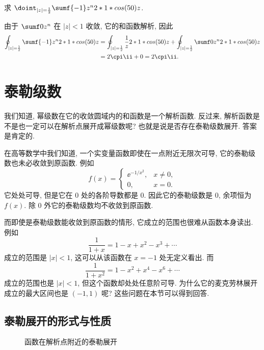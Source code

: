 \begin{example}
  求 $\doint_{|z|=\half} \sumf{-1} z^n\d z$.
\end{example}

\begin{solution}
  由于 $\sumf0 z^n$ 在 $|z|<1$ 收敛, 它的和函数解析, 因此
  \begin{align*}
     \oint_{|z|=\half} \sumf{-1} z^n\d z&
    =\oint_{|z|=\half}\frac1z\d z
      +\oint_{|z|=\half} \sumf0 z^n\d z\\&
    =2\cpi\ii +0
    =2\cpi\ii.
  \end{align*}
\end{solution}



\section{泰勒级数}

我们知道, 幂级数在它的收敛圆域内的和函数是一个解析函数.
反过来, 解析函数是不是也一定可以在解析点展开成幂级数呢? 也就是说是否存在泰勒级数展开. 答案是肯定的.

在高等数学中我们知道, 一个实变量函数即使在一点附近无限次可导, 它的泰勒级数也未必收敛到原函数.
例如
\[
  f(x)=\begin{cases}
    \ee^{-1/x^2},&x\neq 0,\\
    0,&x=0.
  \end{cases}
\]
它处处可导, 但是它在 $0$ 处的各阶导数都是 $0$.
因此它的泰勒级数是 $0$, 余项恒为 $f(x)$.
除 $0$ 外它的泰勒级数均不收敛到原函数.

而即使是泰勒级数能收敛到原函数的情形, 它成立的范围也很难从函数本身读出.
例如
\[
  \dfrac1{1+x}=1-x+x^2-x^3+\cdots
\]
成立的范围是 $|x|<1$, 这可以从该函数在 $x=-1$ 处无定义看出.
而
\[
  \dfrac1{1+x^2}=1-x^2+x^4-x^6+\cdots
\]
成立的范围也是 $|x|<1$, 但这个函数却处处任意阶可导.
为什么它的麦克劳林展开成立的最大区间也是 $(-1,1)$ 呢?
这些问题在本节可以得到回答.


\subsection{泰勒展开的形式与性质}

\begin{figure}[!htb]
  \centering
  \caption{函数在解析点附近的泰勒展开}
\end{figure}

